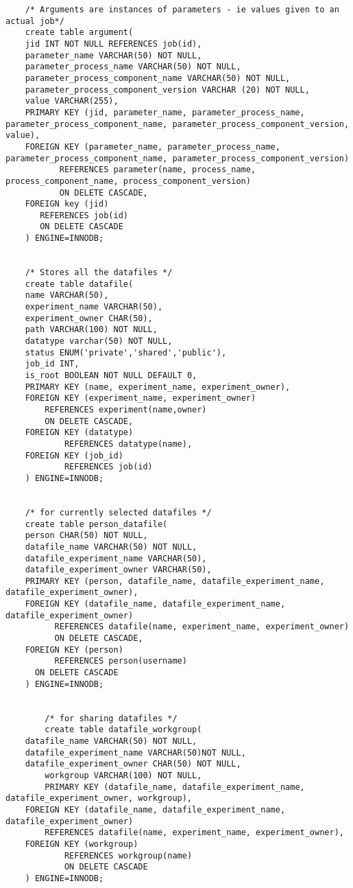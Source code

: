 \begin{tiny}
\begin{verbatim}
	/* Arguments are instances of parameters - ie values given to an actual job*/
	create table argument(
	jid INT NOT NULL REFERENCES job(id),
	parameter_name VARCHAR(50) NOT NULL,
	parameter_process_name VARCHAR(50) NOT NULL,
	parameter_process_component_name VARCHAR(50) NOT NULL,
	parameter_process_component_version VARCHAR (20) NOT NULL,
	value VARCHAR(255),
	PRIMARY KEY (jid, parameter_name, parameter_process_name, parameter_process_component_name, parameter_process_component_version, value),
	FOREIGN KEY (parameter_name, parameter_process_name, parameter_process_component_name, parameter_process_component_version)
           REFERENCES parameter(name, process_name, process_component_name, process_component_version)
           ON DELETE CASCADE,
	FOREIGN key (jid)
	   REFERENCES job(id)
	   ON DELETE CASCADE
	) ENGINE=INNODB;


 	/* Stores all the datafiles */
 	create table datafile(
 	name VARCHAR(50),
 	experiment_name VARCHAR(50),
 	experiment_owner CHAR(50),
 	path VARCHAR(100) NOT NULL,
 	datatype varchar(50) NOT NULL,
	status ENUM('private','shared','public'),
	job_id INT,
	is_root BOOLEAN NOT NULL DEFAULT 0,
	PRIMARY KEY (name, experiment_name, experiment_owner),
	FOREIGN KEY (experiment_name, experiment_owner)
	    REFERENCES experiment(name,owner)
	    ON DELETE CASCADE,
	FOREIGN KEY (datatype) 
            REFERENCES datatype(name),
	FOREIGN KEY (job_id)
            REFERENCES job(id)
 	) ENGINE=INNODB;


	/* for currently selected datafiles */
	create table person_datafile(
	person CHAR(50) NOT NULL,
	datafile_name VARCHAR(50) NOT NULL,
	datafile_experiment_name VARCHAR(50),
	datafile_experiment_owner VARCHAR(50),
	PRIMARY KEY (person, datafile_name, datafile_experiment_name, datafile_experiment_owner),
	FOREIGN KEY (datafile_name, datafile_experiment_name, datafile_experiment_owner)
          REFERENCES datafile(name, experiment_name, experiment_owner)
          ON DELETE CASCADE,
	FOREIGN KEY (person)
          REFERENCES person(username)
	  ON DELETE CASCADE
	) ENGINE=INNODB;


        /* for sharing datafiles */
        create table datafile_workgroup(
 	datafile_name VARCHAR(50) NOT NULL,
 	datafile_experiment_name VARCHAR(50)NOT NULL,
 	datafile_experiment_owner CHAR(50) NOT NULL,
        workgroup VARCHAR(100) NOT NULL,
        PRIMARY KEY (datafile_name, datafile_experiment_name, datafile_experiment_owner, workgroup),
	FOREIGN KEY (datafile_name, datafile_experiment_name, datafile_experiment_owner)
	    REFERENCES datafile(name, experiment_name, experiment_owner),
	FOREIGN KEY (workgroup) 
            REFERENCES workgroup(name)
            ON DELETE CASCADE
	) ENGINE=INNODB;


\end{verbatim}
\end{tiny}
